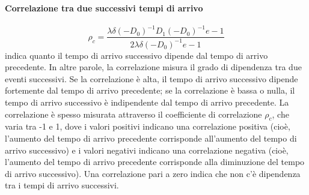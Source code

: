 \documentclass[11pt]{article}
\begin{document}
\paragraph{Correlazione tra due successivi tempi di arrivo}
    $$ \rho_c = \frac{\lambda \delta (-D_0)^{-1} D_1 (-D_0)^{-1} e - 1}{2 \lambda \delta (-D_0)^{-1} e - 1} $$
    indica quanto il tempo di arrivo successivo dipende dal tempo di arrivo precedente. In altre parole, la correlazione misura il grado di dipendenza tra due eventi successivi. Se la correlazione è alta, il tempo di arrivo successivo dipende fortemente dal tempo di arrivo precedente; se la correlazione è bassa o nulla, il tempo di arrivo successivo è indipendente dal tempo di arrivo precedente. La correlazione è spesso misurata attraverso il coefficiente di correlazione $\rho_c$, che varia tra -1 e 1, dove i valori positivi indicano una correlazione positiva (cioè, l'aumento del tempo di arrivo precedente corrisponde all'aumento del tempo di arrivo successivo) e i valori negativi indicano una correlazione negativa (cioè, l'aumento del tempo di arrivo precedente corrisponde alla diminuzione del tempo di arrivo successivo). Una correlazione pari a zero indica che non c'è dipendenza tra i tempi di arrivo successivi. \\
\end{document}
